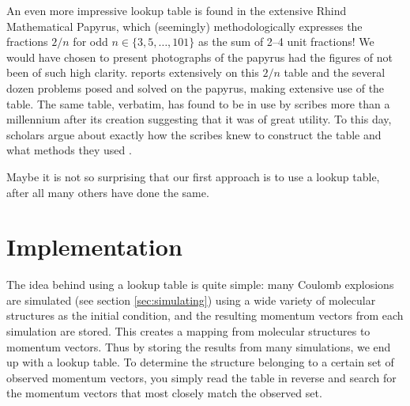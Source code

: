 An even more impressive lookup table is found in the extensive Rhind Mathematical Papyrus, which (seemingly) methodologically expresses the fractions $2/n$ for odd $n \in \lbrace 3, 5, \dots, 101 \rbrace$ as the sum of 2--4 unit fractions! We would have chosen to present photographs of the papyrus had the figures of \citep{Glanville27} not been of such high clarity. \citet{Gillings82} reports extensively on this $2/n$ table and the several dozen problems posed and solved on the papyrus, making extensive use of the table. The same table, verbatim, has found to be in use by scribes more than a millennium after its creation suggesting that it was of great utility. To this day, scholars argue about exactly how the scribes knew to construct the table and what methods they used \citep{Gillings74, Abdulaziz08}.

Maybe it is not so surprising that our first approach is to use a lookup table, after all many others have done the same.\footnotemark



\section{Implementation}

The idea behind using a lookup table is quite simple: many Coulomb explosions are simulated (see section \ref{sec:simulating}) using a wide variety of molecular structures as the initial condition, and the resulting momentum vectors from each simulation are stored. This creates a mapping from molecular structures to momentum vectors. Thus by storing the results from many simulations, we end up with a lookup table. To determine the structure belonging to a certain set of observed momentum vectors, you simply read the table in reverse and search for the momentum vectors that most closely match the observed set.

